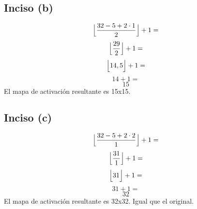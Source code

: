 \documentclass[12pt, a4paper]{article}
\begin{document}
        \subsection*{Inciso (b)}
            \[\Bigl\lfloor\frac{32 - 5 + 2 \cdot 1}{2}\Bigr\rfloor + 1 =\]
            \[\Bigl\lfloor\frac{29}{2}\Bigr\rfloor + 1 =\]
            \[\Bigl\lfloor 14,5 \Bigr\rfloor + 1 =\]
            \[14 + 1 =\]
            \[15\]
            \noindent El mapa de activación resultante es 15x15.
        \subsection*{Inciso (c)}
            \[\Bigl\lfloor\frac{32 - 5 + 2 \cdot 2}{1}\Bigr\rfloor + 1 =\]
            \[\Bigl\lfloor\frac{31}{1}\Bigr\rfloor + 1 =\]
            \[\Bigl\lfloor 31 \Bigr\rfloor + 1 =\]
            \[31 + 1 =\]
            \[32\]
            \noindent El mapa de activación resultante es 32x32. Igual que el original.
\end{document}

